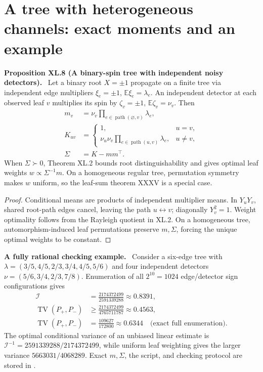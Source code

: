 \documentclass[11pt,a4paper,oneside]{book}
\newcommand{\statement}[3]{\par\medskip\noindent\textbf{#1 #2 (#3).}\ }
\newcommand{\note}[1]{\par\medskip\noindent\textbf{#1}\ }
\begin{document}
\section{A tree with heterogeneous channels: exact moments and an example}
\statement{Proposition}{XL.8}{A binary-spin tree with independent noisy detectors}
Let a binary root $X=\pm1$ propagate on a finite tree via independent edge multipliers $\xi_e=\pm1$, $\mathbb E\xi_e=\lambda_e$. An independent detector at each observed leaf $v$ multiplies its spin by $\zeta_v=\pm1$, $\mathbb E\zeta_v=\nu_v$. Then
\begin{align}m_v&=\nu_v\prod_{e\in\operatorname{path}(\varnothing,v)}\lambda_e,\tag{161}\\
K_{uv}&=\begin{cases}1,&u=v,\\\nu_u\nu_v\displaystyle\prod_{e\in\operatorname{path}(u,v)}\lambda_e,&u\ne v,\end{cases}\tag{162}\\
\Sigma&=K-mm^\top.\tag{163}\end{align}
When $\Sigma\succ0$, Theorem XL.2 bounds root distinguishability and gives optimal leaf weights $w\propto\Sigma^{-1}m$. On a homogeneous regular tree, permutation symmetry makes $w$ uniform, so the leaf-sum theorem XXXV is a special case.
\begin{proof}
Conditional means are products of independent multiplier means. In $Y_uY_v$, shared root-path edges cancel, leaving the path $u\leftrightarrow v$; diagonally $Y_v^2=1$. Weight optimality follows from the Rayleigh quotient in XL.2. On a homogeneous tree, automorphism-induced leaf permutations preserve $m,\Sigma$, forcing the unique optimal weights to be constant.
\end{proof}
\note{A fully rational checking example.} Consider a six-edge tree with $\lambda=(3/5,4/5,2/3,3/4,4/5,5/6)$ and four independent detectors $\nu=(5/6,3/4,2/3,7/8)$. Enumeration of all $2^{10}=1024$ edge/detector sign configurations gives
\begin{align}\mathcal I&=\frac{2174372499}{2591339288}\approx0.8391,\tag{164}\\
\operatorname{TV}(P_+,P_-)&\ge\frac{2174372499}{4765711787}\approx0.4563,\tag{165}\\
\operatorname{TV}(P_+,P_-)&=\frac{109627}{172800}\approx0.6344\quad\text{(exact full enumeration).}\tag{166}\end{align}
The optimal conditional variance of an unbiased linear estimate is $\mathcal I^{-1}=2591339288/2174372499$, while uniform leaf weighting gives the larger variance $5663031/4068289$. Exact $m,\Sigma$, the script, and checking protocol are stored in .
\end{document}
